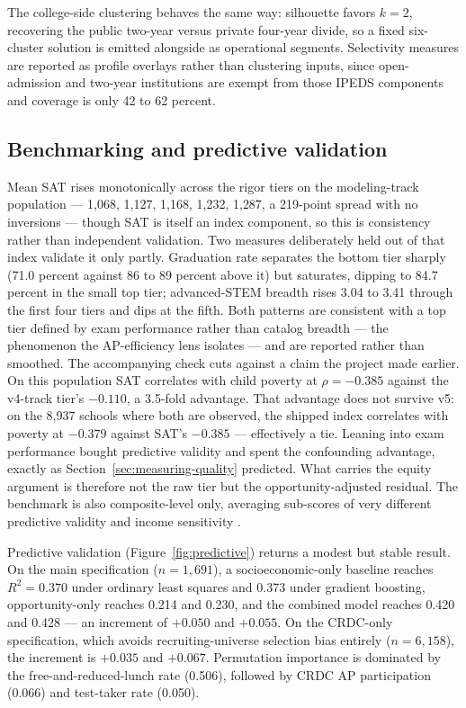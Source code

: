 \documentclass[12pt]{article}
\begin{document}
The college-side clustering behaves the same way: silhouette favors $k = 2$, recovering the public two-year versus private four-year divide, so a fixed six-cluster solution is emitted alongside as operational segments. Selectivity measures are reported as profile overlays rather than clustering inputs, since open-admission and two-year institutions are exempt from those IPEDS components and coverage is only 42 to 62 percent.

\subsection{Benchmarking and predictive validation}

Mean SAT rises monotonically across the rigor tiers on the modeling-track population --- 1{,}068, 1{,}127, 1{,}168, 1{,}232, 1{,}287, a 219-point spread with no inversions --- though SAT is itself an index component, so this is consistency rather than independent validation. Two measures deliberately held out of that index validate it only partly. Graduation rate separates the bottom tier sharply (71.0 percent against 86 to 89 percent above it) but saturates, dipping to 84.7 percent in the small top tier; advanced-STEM breadth rises 3.04 to 3.41 through the first four tiers and dips at the fifth. Both patterns are consistent with a top tier defined by exam performance rather than catalog breadth --- the phenomenon the AP-efficiency lens isolates --- and are reported rather than smoothed. The accompanying check cuts against a claim the project made earlier. On this population SAT correlates with child poverty at $\rho = -0.385$ against the v4-track tier's $-0.110$, a 3.5-fold advantage. That advantage does not survive v5: on the 8{,}937 schools where both are observed, the shipped index correlates with poverty at $-0.379$ against SAT's $-0.385$ --- effectively a tie. Leaning into exam performance bought predictive validity and spent the confounding advantage, exactly as Section~\ref{sec:measuring-quality} predicted. What carries the equity argument is therefore not the raw tier but the opportunity-adjusted residual. The benchmark is also composite-level only, averaging sub-scores of very different predictive validity and income sensitivity \citep{geiser_studley2002,bettinger2013}.

Predictive validation (Figure~\ref{fig:predictive}) returns a modest but stable result. On the main specification ($n = 1{,}691$), a socioeconomic-only baseline reaches $R^2 = 0.370$ under ordinary least squares and 0.373 under gradient boosting, opportunity-only reaches 0.214 and 0.230, and the combined model reaches 0.420 and 0.428 --- an increment of $+0.050$ and $+0.055$. On the CRDC-only specification, which avoids recruiting-universe selection bias entirely ($n = 6{,}158$), the increment is $+0.035$ and $+0.067$. Permutation importance is dominated by the free-and-reduced-lunch rate (0.506), followed by CRDC AP participation (0.066) and test-taker rate (0.050).
\end{document}
